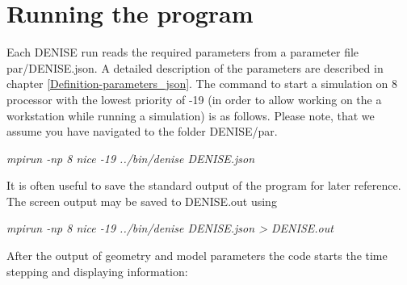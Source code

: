 \section{Running the program}\label{compexec1} 
Each DENISE run reads the required parameters from a parameter file par/DENISE.json. A detailed description of the parameters are described in chapter \ref{Definition-parameters_json}. 
The command to start a simulation on 8 processor with the lowest priority of -19 (in order to allow working on the a workstation while running a simulation) is as follows. Please note, that we assume you have navigated to the folder DENISE/par.
\newline

\textit{mpirun -np 8 nice -19 ../bin/denise DENISE.json }
\newline

It is often useful to save the standard output of the program for later reference. The screen output may be saved to DENISE.out using
\newline

\textit{mpirun -np 8 nice -19 ../bin/denise DENISE.json > DENISE.out}
\newline


After the output of geometry and model parameters the code starts the time stepping and displaying information:

